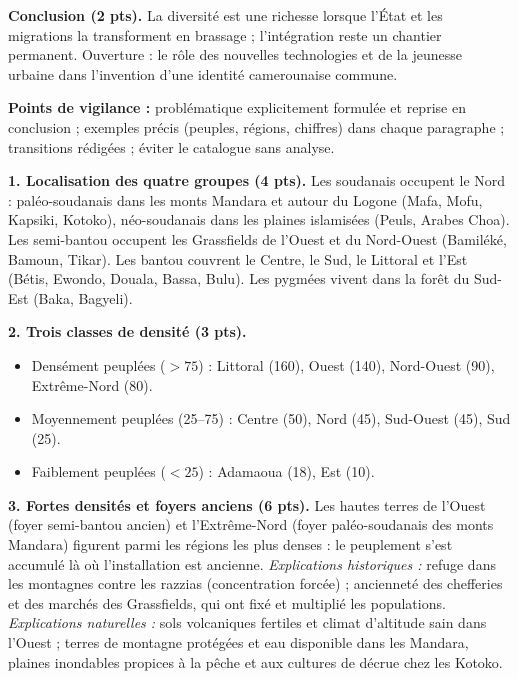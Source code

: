 \documentclass[11pt]{article}
\begin{document}
\begin{corrige}
\textbf{Conclusion (2 pts).} La diversité est une richesse lorsque l'État et les migrations la transforment en brassage ; l'intégration reste un chantier permanent. Ouverture : le rôle des nouvelles technologies et de la jeunesse urbaine dans l'invention d'une identité camerounaise commune.

\textbf{Points de vigilance :} problématique explicitement formulée et reprise en conclusion ; exemples précis (peuples, régions, chiffres) dans chaque paragraphe ; transitions rédigées ; éviter le catalogue sans analyse.
\end{corrige}

\begin{corrige}
\textbf{1. Localisation des quatre groupes (4 pts).} Les soudanais occupent le Nord : paléo-soudanais dans les monts Mandara et autour du Logone (Mafa, Mofu, Kapsiki, Kotoko), néo-soudanais dans les plaines islamisées (Peuls, Arabes Choa). Les semi-bantou occupent les Grassfields de l'Ouest et du Nord-Ouest (Bamiléké, Bamoun, Tikar). Les bantou couvrent le Centre, le Sud, le Littoral et l'Est (Bétis, Ewondo, Douala, Bassa, Bulu). Les pygmées vivent dans la forêt du Sud-Est (Baka, Bagyeli).

\textbf{2. Trois classes de densité (3 pts).}
\begin{itemize}
\item Densément peuplées ($> 75$) : Littoral (160), Ouest (140), Nord-Ouest (90), Extrême-Nord (80).
\item Moyennement peuplées (25--75) : Centre (50), Nord (45), Sud-Ouest (45), Sud (25).
\item Faiblement peuplées ($< 25$) : Adamaoua (18), Est (10).
\end{itemize}

\textbf{3. Fortes densités et foyers anciens (6 pts).} Les hautes terres de l'Ouest (foyer semi-bantou ancien) et l'Extrême-Nord (foyer paléo-soudanais des monts Mandara) figurent parmi les régions les plus denses : le peuplement s'est accumulé là où l'installation est ancienne. \emph{Explications historiques :} refuge dans les montagnes contre les razzias (concentration forcée) ; ancienneté des chefferies et des marchés des Grassfields, qui ont fixé et multiplié les populations. \emph{Explications naturelles :} sols volcaniques fertiles et climat d'altitude sain dans l'Ouest ; terres de montagne protégées et eau disponible dans les Mandara, plaines inondables propices à la pêche et aux cultures de décrue chez les Kotoko.


\end{corrige}
\end{document}
